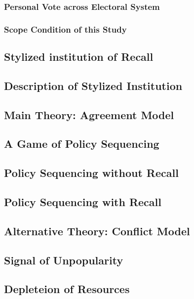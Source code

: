 \documentclass[hyphens, crop=false]{standalone}
\begin{document}
		\subsubsection*{Personal Vote across Electoral System}
			
		
		\subsubsection*{Scope Condition of this Study}
		
	
	\subsection*{Stylized institution of Recall}
		
		\subsection*{Description of Stylized Institution}
		
	\subsection*{Main Theory: Agreement Model}
	
		\subsection*{A Game of Policy Sequencing}
		
		\subsection*{Policy Sequencing without Recall}
		
		\subsection*{Policy Sequencing with Recall}
	
	\subsection*{Alternative Theory: Conflict Model}
	
		\subsection*{Signal of Unpopularity}
	
		\subsection*{Depleteion of Resources}

	
		
	\newpage
	\printbibliography
	
	
\end{document}
